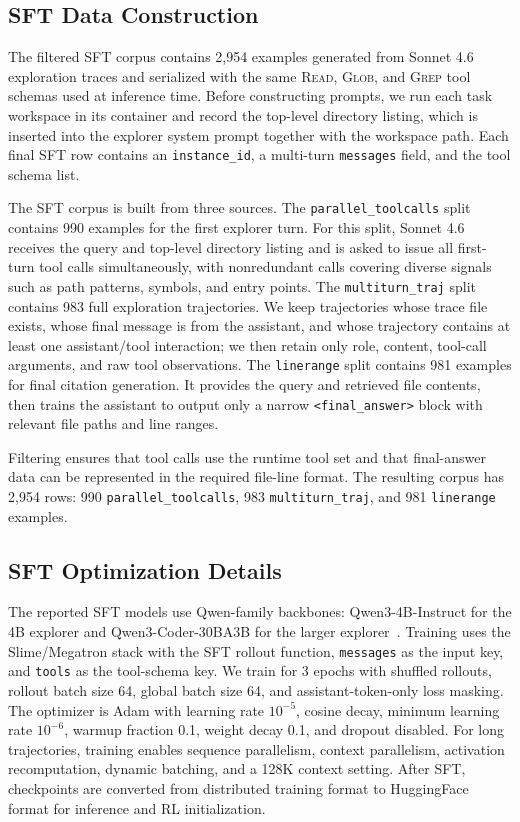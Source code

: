 \documentclass{llmxive}
\begin{document}
\subsection{SFT Data Construction}
\label{app:sft-data}

The filtered SFT corpus contains 2,954 examples generated from Sonnet 4.6 exploration traces and serialized with the same \textsc{Read}, \textsc{Glob}, and \textsc{Grep} tool schemas used at inference time.
Before constructing prompts, we run each task workspace in its container and record the top-level directory listing, which is inserted into the explorer system prompt together with the workspace path.
Each final SFT row contains an \texttt{instance\_id}, a multi-turn \texttt{messages} field, and the tool schema list.

The SFT corpus is built from three sources.
The \texttt{parallel\_toolcalls} split contains 990 examples for the first explorer turn.
For this split, Sonnet 4.6 receives the query and top-level directory listing and is asked to issue all first-turn tool calls simultaneously, with nonredundant calls covering diverse signals such as path patterns, symbols, and entry points.
The \texttt{multiturn\_traj} split contains 983 full exploration trajectories.
We keep trajectories whose trace file exists, whose final message is from the assistant, and whose trajectory contains at least one assistant/tool interaction; we then retain only role, content, tool-call arguments, and raw tool observations.
The \texttt{linerange} split contains 981 examples for final citation generation.
It provides the query and retrieved file contents, then trains the assistant to output only a narrow \texttt{<final\_answer>} block with relevant file paths and line ranges.

Filtering ensures that tool calls use the runtime tool set and that final-answer data can be represented in the required file-line format.
The resulting corpus has 2,954 rows: 990 \texttt{parallel\_toolcalls}, 983 \texttt{multiturn\_traj}, and 981 \texttt{linerange} examples.

\subsection{SFT Optimization Details}
\label{app:sft-optimization}

The reported SFT models use Qwen-family backbones: Qwen3-4B-Instruct for the 4B explorer and Qwen3-Coder-30BA3B for the larger explorer~\cite{qwen3}.
Training uses the Slime/Megatron stack with the SFT rollout function, \texttt{messages} as the input key, and \texttt{tools} as the tool-schema key.
We train for 3 epochs with shuffled rollouts, rollout batch size 64, global batch size 64, and assistant-token-only loss masking.
The optimizer is Adam with learning rate $10^{-5}$, cosine decay, minimum learning rate $10^{-6}$, warmup fraction 0.1, weight decay 0.1, and dropout disabled.
For long trajectories, training enables sequence parallelism, context parallelism, activation recomputation, dynamic batching, and a 128K context setting.
After SFT, checkpoints are converted from distributed training format to HuggingFace format for inference and RL initialization.
\end{document}
